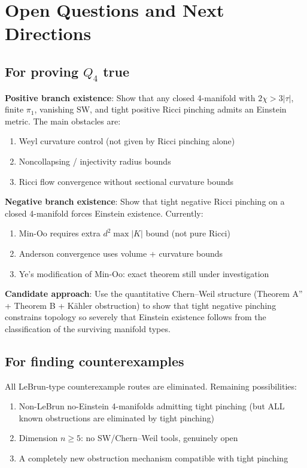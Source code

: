 \section{Open Questions and Next Directions}

\subsection{For proving $Q_4$ true}

\textbf{Positive branch existence}: Show that any closed 4-manifold with
$2\chi > 3|\tau|$, finite $\pi_1$, vanishing SW, and tight positive Ricci pinching
admits an Einstein metric. The main obstacles are:
\begin{enumerate}
\item Weyl curvature control (not given by Ricci pinching alone)
\item Noncollapsing / injectivity radius bounds
\item Ricci flow convergence without sectional curvature bounds
\end{enumerate}

\textbf{Negative branch existence}: Show that tight negative Ricci pinching on a
closed 4-manifold forces Einstein existence. Currently:
\begin{enumerate}
\item Min-Oo requires extra $d^2\max|K|$ bound (not pure Ricci)
\item Anderson convergence uses volume + curvature bounds
\item Ye's modification of Min-Oo: exact theorem still under investigation
\end{enumerate}

\textbf{Candidate approach}: Use the quantitative Chern--Weil structure
(Theorem A'' + Theorem B + Kähler obstruction) to show that tight negative
pinching constrains topology so severely that Einstein existence follows
from the classification of the surviving manifold types.

\subsection{For finding counterexamples}

All LeBrun-type counterexample routes are eliminated. Remaining possibilities:
\begin{enumerate}
\item Non-LeBrun no-Einstein 4-manifolds admitting tight pinching
      (but ALL known obstructions are eliminated by tight pinching)
\item Dimension $n \geq 5$: no SW/Chern--Weil tools, genuinely open
\item A completely new obstruction mechanism compatible with tight pinching
\end{enumerate}

